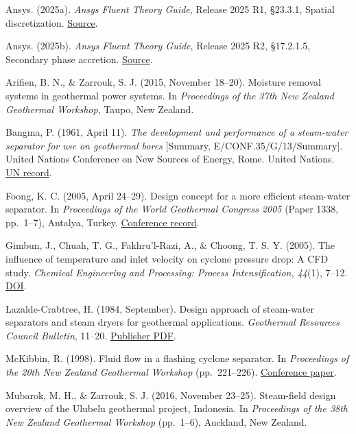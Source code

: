 Ansys. (2025a). \emph{Ansys Fluent Theory Guide}, Release 2025 R1, §23.3.1, Spatial discretization. \href{https://ansyshelp.ansys.com/public/Views/Secured/corp/v251/en/flu_th/flu_th_SolveDiscretization_spatial.html}{Source}.

Ansys. (2025b). \emph{Ansys Fluent Theory Guide}, Release 2025 R2, §17.2.1.5, Secondary phase accretion. \href{https://ansyshelp.ansys.com/public/Views/Secured/corp/v252/en/flu_th/flu_th_ewf_sec_film_submodels.html}{Source}.

Arifien, B. N., \& Zarrouk, S. J. (2015, November 18--20). Moisture removal systems in geothermal power systems. In \emph{Proceedings of the 37th New Zealand Geothermal Workshop}, Taupo, New Zealand.

Bangma, P. (1961, April 11). \emph{The development and performance of a steam-water separator for use on geothermal bores} {[}Summary, E/CONF.35/G/13/Summary{]}. United Nations Conference on New Sources of Energy, Rome. United Nations. \href{https://digitallibrary.un.org/record/3833604?ln=en}{UN record}.

Foong, K. C. (2005, April 24--29). Design concept for a more efficient steam-water separator. In \emph{Proceedings of the World Geothermal Congress 2005} (Paper 1338, pp.~1--7), Antalya, Turkey. \href{https://pangea.stanford.edu/ERE/db/IGAstandard/record_detail.php?id=1066}{Conference record}.

Gimbun, J., Chuah, T. G., Fakhru'l-Razi, A., \& Choong, T. S. Y. (2005). The influence of temperature and inlet velocity on cyclone pressure drop: A CFD study. \emph{Chemical Engineering and Processing: Process Intensification, 44}(1), 7--12. \href{https://doi.org/10.1016/j.cep.2004.03.005}{DOI}.

Lazalde-Crabtree, H. (1984, September). Design approach of steam-water separators and steam dryers for geothermal applications. \emph{Geothermal Resources Council Bulletin}, 11--20. \href{https://publications.mygeoenergynow.org/grc/7000229.pdf}{Publisher PDF}.

McKibbin, R. (1998). Fluid flow in a flashing cyclone separator. In \emph{Proceedings of the 20th New Zealand Geothermal Workshop} (pp.~221--226). \href{https://pangea.stanford.edu/ERE/pdf/IGAstandard/NZGW/1998/McKibbin.pdf}{Conference paper}.

Mubarok, M. H., \& Zarrouk, S. J. (2016, November 23--25). Steam-field design overview of the Ulubelu geothermal project, Indonesia. In \emph{Proceedings of the 38th New Zealand Geothermal Workshop} (pp.~1--6), Auckland, New Zealand.

